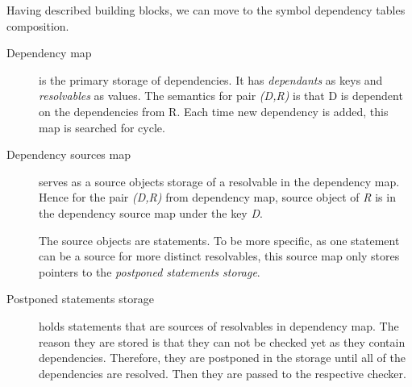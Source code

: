 \vspace{0.5cm}

Having described building blocks, we can move to the symbol dependency tables composition.
\begin{description}
	\item[Dependency map] is the primary storage of dependencies. It has \emph{dependants} as keys and \emph{resolvables} as values. The semantics for pair \emph{(D,R)} is that D is dependent on the dependencies from R. Each time new dependency is added, this map is searched for cycle.
	
	\item[Dependency sources map] serves as a source objects storage of a resolvable in the dependency map. Hence for the pair \emph{(D,R)} from dependency map, source object of \emph{R} is in the dependency source map under the key \emph{D}. 
	
	The source objects are statements. To be more specific, as one statement can be a source for more distinct resolvables, this source map only stores pointers to the \emph{postponed statements storage}.
	
	\item[Postponed statements storage] holds statements that are sources of resolvables in dependency map. The reason they are stored is that they can not be checked yet as they contain dependencies. Therefore, they are postponed in the storage until all of the dependencies are resolved. Then they are passed to the respective checker.
\end{description}



